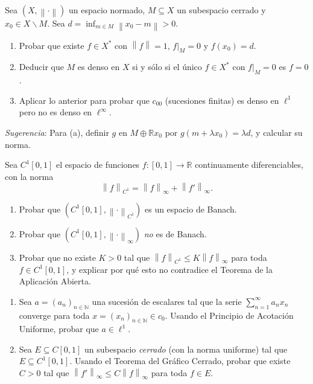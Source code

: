 \documentclass{article}
\theoremstyle{definition}
\newcommand{\R}{\mathbb{R}}
\newcommand{\N}{\mathbb{N}}
\newcommand{\norm}[1]{\left\lVert #1 \right\rVert}       %
\newcommand{\setdiff}{\smallsetminus}                    %
\newenvironment{ejercicio}[1]{\begin{trivlist}
\item[\hskip \labelsep {\bfseries Ejercicio}\hskip \labelsep {\bfseries #1.}]}{\end{trivlist}}
\begin{document}
\vspace{0.3cm}

\begin{ejercicio}{2}
    Sea \( (X,\norm{\cdot}) \) un espacio normado, \( M \subseteq X \) un subespacio cerrado y \( x_0 \in X \setdiff M \). Sea \( d = \inf_{m \in M} \norm{x_0 - m} > 0 \).
    \begin{enumerate}
        \item Probar que existe \( f \in X^* \) con \( \norm{f} = 1 \), \( f|_M = 0 \) y \( f(x_0) = d \).
        \item Deducir que \( M \) es denso en \( X \) si y sólo si el único \( f \in X^* \) con \( f|_M = 0 \) es \( f = 0 \).
        \item Aplicar lo anterior para probar que \( c_{00} \) (sucesiones finitas) es denso en \( \ell^1 \) pero no es denso en \( \ell^\infty \).
    \end{enumerate}
    \emph{Sugerencia}: Para (a), definir \( g \) en \( M \oplus \R x_0 \) por \( g(m + \lambda x_0) = \lambda d \), y calcular su norma.
\end{ejercicio}

\vspace{0.3cm}

\begin{ejercicio}{3}
    Sea \( C^1[0,1] \) el espacio de funciones \( f : [0,1] \to \R \) continuamente diferenciables, con la norma
    \[
        \norm{f}_{C^1} = \norm{f}_\infty + \norm{f'}_\infty.
    \]
    \begin{enumerate}
        \item Probar que \( (C^1[0,1], \norm{\cdot}_{C^1}) \) es un espacio de Banach.
        \item Probar que \( (C^1[0,1], \norm{\cdot}_\infty) \) \emph{no} es de Banach.
        \item Probar que no existe \( K > 0 \) tal que \( \norm{f}_{C^1} \le K \norm{f}_\infty \) para toda \( f \in C^1[0,1] \), y explicar por qué esto no contradice el Teorema de la Aplicación Abierta.
    \end{enumerate}
\end{ejercicio}

\vspace{0.3cm}

\begin{ejercicio}{4}
    \begin{enumerate}
        \item Sea \( a = {(a_n)}_{n\in\N} \) una sucesión de escalares tal que la serie \( \sum_{n=1}^\infty a_n x_n \) converge para toda \( x = {(x_n)}_{n\in\N} \in c_0 \). Usando el Principio de Acotación Uniforme, probar que \( a \in \ell^1 \).
        \item Sea \( E \subseteq C[0,1] \) un subespacio \emph{cerrado} (con la norma uniforme) tal que \( E \subseteq C^1[0,1] \). Usando el Teorema del Gráfico Cerrado, probar que existe \( C > 0 \) tal que \( \norm{f'}_\infty \le C \norm{f}_\infty \) para toda \( f \in E \).
    \end{enumerate}
\end{ejercicio}
\end{document}
